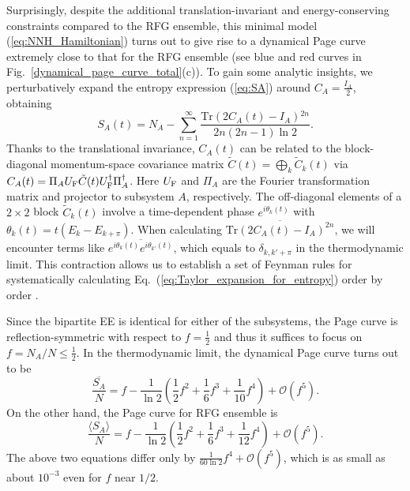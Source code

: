 \documentclass[twocolumn,english,prl,aps,superscriptaddress,amsmath,amssymb,floatfix]{revtex4-2}
\begin{document}
Surprisingly, despite the additional translation-invariant and energy-conserving constraints compared to the RFG ensemble, this minimal model (\ref{eq:NNH_Hamiltonian}) turns out to give rise to 
a dynamical Page curve extremely close to that for the 
RFG ensemble 
(see blue and red curves in Fig.~\ref{dynamical_page_curve_total}(c)). 
To gain some analytic insights, we perturbatively expand 
the entropy expression (\ref{eq:SA}) 
around $C_{A}=\frac{I_{A}}{2}$, obtaining 
\begin{equation}
S_{A}(t)=N_{A}-\sum_{n=1}^{\infty}\frac{\mathrm{Tr}(2C_{A}(t)-I_{A}){}^{2n}}{2n(2n-1)\ln2}.
\label{eq:Taylor_expansion_for_entropy}
\end{equation}
Thanks to the translational invariance, $C_{A}(t)$ can be related to the block-diagonal momentum-space covariance matrix $\tilde C(t)=\bigoplus_k\tilde C_k(t)$ via 
$C_{A}(t)=\Pi_{A}U_{\rm F}\tilde{C}(t)U^{\dagger}_{\rm F}\Pi_{A}^{\dagger}$. Here
$U_{\rm F}$ and $\Pi_{A}$ are the Fourier transformation matrix and projector 
to subsystem $A$, respectively. 
The off-diagonal
elements of a $2\times2$ block $\tilde{C}_k(t)$ involve 
a time-dependent 
phase
$e^{i\theta_{k}(t)}$ with 
$\theta_{k}(t)=t(E_{k}-E_{k+\pi})$.
When calculating $\overline{\mathrm{Tr}(2C_{A}(t)-I_{A})^{2n}}$, 
we will encounter %
terms like $\overline{e^{i\theta_{k}(t)}e^{i\theta_{k'}(t)}}$,
which equals to $\delta_{k,k'+\pi}$ in the thermodynamic limit.
This contraction allows us to establish a set of Feynman rules for 
systematically calculating Eq.~(\ref{eq:Taylor_expansion_for_entropy})
order by order \cite{SM}. 


Since the bipartite EE is identical for either of the subsystems, the Page curve is reflection-symmetric with respect to $f=\frac{1}{2}$ and thus 
 it suffices to 
focus on $f=N_A/N\leq\frac{1}{2}$. In the thermodynamic limit, the dynamical Page curve turns out to be \cite{SM} 
\begin{equation}
\frac{\overline{S_{A}}}{N}=f-\frac{1}{\ln{2}}\left(\frac{1}{2}f^{2}+\frac{1}{6}f^{3}+\frac{1}{10}f^{4}\right)+\mathcal{O}(f^{5}).\label{eq:the_Page_curve_for_NNH}
\end{equation}
 On the other hand, the 
 Page curve for RFG ensemble
is \citep{Bianchi2021}
\begin{equation}
\frac{\langle S_{A}\rangle}{N}=f-\frac{1}{\ln{2}}\left(\frac{1}{2}f^{2}+\frac{1}{6}f^{3}+\frac{1}{12}f^{4}\right)+\mathcal{O}(f^{5}).\label{eq:the_Page_curve_result_for_CCRFG}
\end{equation}
The above two equations differ 
only by $\frac{1}{60\ln{2}}f^{4}+\mathcal{O}(f^5)$, 
which is as small as about $
10^{-3}$ even for $f$ near $1/2$.
\end{document}

